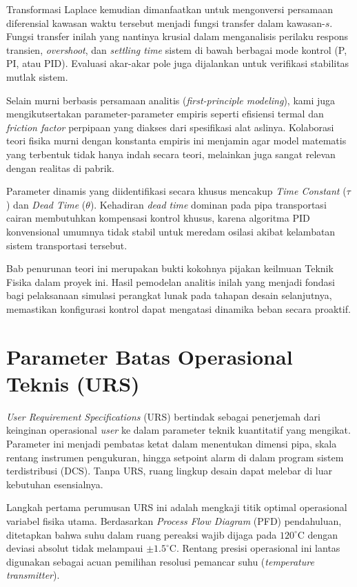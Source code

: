 \documentclass[12pt, a4paper]{report}
\begin{document}
Transformasi Laplace kemudian dimanfaatkan untuk mengonversi persamaan diferensial kawasan waktu tersebut menjadi fungsi transfer dalam kawasan-$s$. Fungsi transfer inilah yang nantinya krusial dalam menganalisis perilaku respons transien, \textit{overshoot}, dan \textit{settling time} sistem di bawah berbagai mode kontrol (P, PI, atau PID). Evaluasi akar-akar pole juga dijalankan untuk verifikasi stabilitas mutlak sistem.

Selain murni berbasis persamaan analitis (\textit{first-principle modeling}), kami juga mengikutsertakan parameter-parameter empiris seperti efisiensi termal dan \textit{friction factor} perpipaan yang diakses dari spesifikasi alat aslinya. Kolaborasi teori fisika murni dengan konstanta empiris ini menjamin agar model matematis yang terbentuk tidak hanya indah secara teori, melainkan juga sangat relevan dengan realitas di pabrik.

Parameter dinamis yang diidentifikasi secara khusus mencakup \textit{Time Constant} ($\tau$) dan \textit{Dead Time} ($\theta$). Kehadiran \textit{dead time} dominan pada pipa transportasi cairan membutuhkan kompensasi kontrol khusus, karena algoritma PID konvensional umumnya tidak stabil untuk meredam osilasi akibat kelambatan sistem transportasi tersebut.

Bab penurunan teori ini merupakan bukti kokohnya pijakan keilmuan Teknik Fisika dalam proyek ini. Hasil pemodelan analitis inilah yang menjadi fondasi bagi pelaksanaan simulasi perangkat lunak pada tahapan desain selanjutnya, memastikan konfigurasi kontrol dapat mengatasi dinamika beban secara proaktif.

\section{Parameter Batas Operasional Teknis (URS)}
\textit{User Requirement Specifications} (URS) bertindak sebagai penerjemah dari keinginan operasional \textit{user} ke dalam parameter teknik kuantitatif yang mengikat. Parameter ini menjadi pembatas ketat dalam menentukan dimensi pipa, skala rentang instrumen pengukuran, hingga setpoint alarm di dalam program sistem terdistribusi (DCS). Tanpa URS, ruang lingkup desain dapat melebar di luar kebutuhan esensialnya.

Langkah pertama perumusan URS ini adalah mengkaji titik optimal operasional variabel fisika utama. Berdasarkan \textit{Process Flow Diagram} (PFD) pendahuluan, ditetapkan bahwa suhu dalam ruang pereaksi wajib dijaga pada $120^\circ\text{C}$ dengan deviasi absolut tidak melampaui $\pm 1.5^\circ\text{C}$. Rentang presisi operasional ini lantas digunakan sebagai acuan pemilihan resolusi pemancar suhu (\textit{temperature transmitter}).
\end{document}
